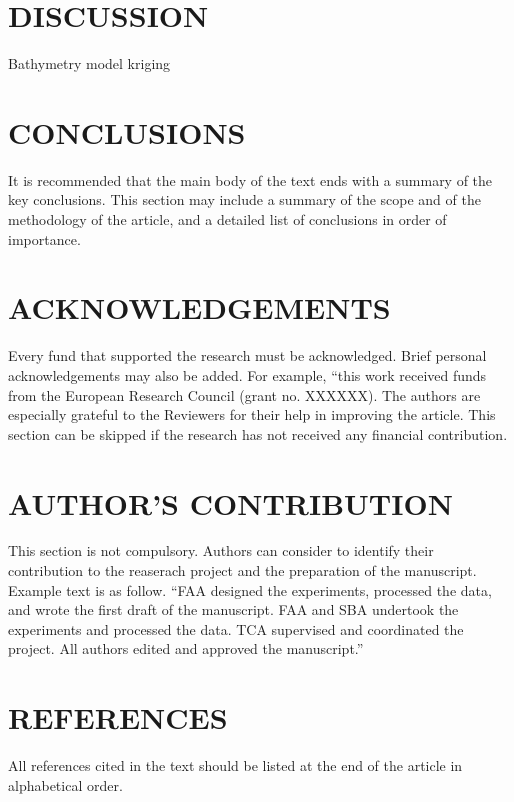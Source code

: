 \documentclass[A4paper,11pt]{marine_2023_Paper}
\begin{document}
\section{DISCUSSION}
Bathymetry model kriging 


\section{CONCLUSIONS}

 It is recommended that the main body of the text ends with a summary of the key conclusions. This section may include a summary of the scope and of the methodology of the article, and a detailed list of conclusions in order of importance.

\section*{ACKNOWLEDGEMENTS}

 Every fund that supported the research must be acknowledged. Brief personal acknowledgements may also be added. For example, ``this work received funds from the European Research Council (grant no. XXXXXX). The authors are especially grateful to the Reviewers for their help in improving the article. This section can be skipped if the research has not received any financial contribution.

 \section*{AUTHOR'S CONTRIBUTION}

 This section is not compulsory. Authors can consider to identify their contribution to the reaserach project and the preparation of the manuscript. Example text is as follow. ``FAA designed the experiments, processed the data, and wrote the first draft of the manuscript. FAA and SBA undertook the experiments and processed the data. TCA supervised and coordinated the project. All authors edited and approved the manuscript.''


\section*{REFERENCES}
All references cited in the text should be listed at the end of the article in alphabetical order.
\end{document}
